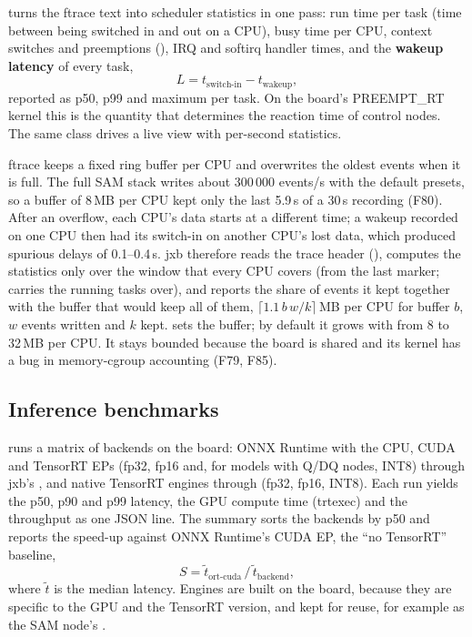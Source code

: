 \documentclass[11pt,a4paper]{article}
\newcommand{\jxb}{\textsf{jxb}}
\newcommand{\finding}[1]{\textsf{\small F#1}}
\begin{document}
 turns the ftrace text into scheduler statistics in one pass: run time per task (time between being
switched in and out on a CPU), busy time per CPU, context switches and preemptions (), IRQ and
softirq handler times, and the \textbf{wakeup latency} of every task,
\begin{equation}
  L = t_{\text{switch-in}} - t_{\text{wakeup}},
\end{equation}
reported as p50, p99 and maximum per task. On the board's PREEMPT\_RT kernel this is the quantity that determines the
reaction time of control nodes. The same class drives a live view with per-second statistics.

ftrace keeps a fixed ring buffer per CPU and overwrites the oldest events when it is full. The full SAM stack writes
about 300\,000 events/s with the default presets, so a buffer of 8\,MB per CPU kept only the last 5.9\,s of a 30\,s
recording (\finding{80}). After an overflow, each CPU's data starts at a different time; a wakeup recorded on one CPU
then had its switch-in on another CPU's lost data, which produced spurious delays of 0.1--0.4\,s. \jxb{} therefore
reads the trace header (), computes the statistics only over the window that
every CPU covers (from the last  marker;  carries the running tasks
over), and reports the share of events it kept together with the buffer that would keep all of them,
$\lceil 1.1\, b\, w / k \rceil$\,MB per CPU for buffer $b$, $w$ events written and $k$ kept.  sets the
buffer; by default it grows with  from 8 to 32\,MB per CPU. It stays bounded because the board is
shared and its kernel has a bug in memory-cgroup accounting (\finding{79}, \finding{85}).

\subsection{Inference benchmarks}
 runs a matrix of backends on the board: ONNX Runtime with the CPU,
CUDA and TensorRT EPs (fp32, fp16 and, for models with Q/DQ nodes, INT8) through \jxb's , and native
TensorRT engines through  (fp32, fp16, INT8). Each run yields the p50, p90 and p99 latency, the GPU
compute time (trtexec) and the throughput as one JSON line. The summary sorts the backends by p50 and reports the
speed-up against ONNX Runtime's CUDA EP, the \enquote{no TensorRT} baseline,
\begin{equation}
  S = \tilde t_{\text{ort-cuda}} \,/\, \tilde t_{\text{backend}},
\end{equation}
where $\tilde t$ is the median latency. Engines are built on the board, because they are specific to the GPU and the
TensorRT version, and kept for reuse, for example as the SAM node's .
\end{document}
